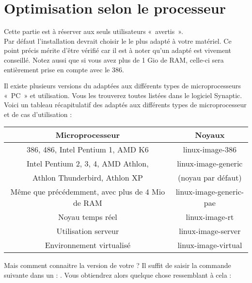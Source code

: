 \section{Optimisation selon le processeur}
Cette partie est à réserver aux seuls utilisateurs «~avertis~».\\
Par défaut l'installation devrait choisir le  le plus adapté à votre matériel. Ce point précis mérite d'être vérifié car il est à noter qu'un  adapté est vivement conseillé. Notez aussi que si vous avez plus de 1 Gio de RAM, celle-ci sera entièrement prise en compte avec le  386.\par
Il existe plusieurs versions du  adaptées aux différents types de microprocesseurs «~PC~» et utilisation. Vous les trouverez toutes listées dans le logiciel Synaptic. Voici un tableau récapitulatif des  adaptés aux différents types de microprocesseur et de cas d'utilisation :\par
\renewcommand{\multirowsetup}{\centering}
\begin{center}
\begin{tabular}{||c|c||}
\hline
\hline
Microprocesseur & Noyaux\\
\hline
\hline
386, 486, Intel Pentium 1, AMD K6 & linux-image-386\\
\hline
Intel Pentium 2, 3, 4, AMD Athlon,& linux-image-generic\\
Athlon Thunderbird, Athlon XP & (noyau par défaut)\\
\hline
Même que précédemment, avec plus de 4 Mio de RAM& linux-image-generic-pae\\
\hline
Noyau temps réel & linux-image-rt\\
\hline
Utilisation serveur & linux-image-server\\
\hline
Environnement virtualisé & linux-image-virtual\\
\hline
\hline
\end{tabular}
\end{center}\par
Mais comment connaitre la version de votre  ? Il suffit de saisir la commande suivante dans un  : . Vous obtiendrez alors quelque chose ressemblant à cela : 
